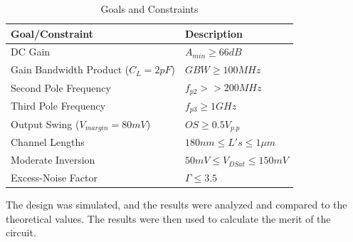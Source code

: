 \begin{table}[h]
    \centering
    \caption{Goals and Constraints}
    \begin{tabularx}{\textwidth}{>{\centering\arraybackslash}X >{\centering\arraybackslash}X}
        \toprule
        \textbf{Goal/Constraint} & \textbf{Description}\\
        \midrule
        DC Gain & $A_{min}\geq 66dB$\\
        \midrule
        Gain Bandwidth Product ($C_L = 2pF$) & $GBW\geq100MHz$ \\
        \midrule
        Second Pole Frequency & $f_{p2}>>200MHz$ \\
        \midrule
        Third Pole Frequency & $f_{p3} \geq 1GHz$ \\
        \midrule
        Output Swing ($V_{margin}=80mV$) & $OS\geq 0.5 V_{p.p}$ \\
        \midrule
        Channel Lengths & $180nm \leq L's \leq 1 \mu m$ \\
        \midrule
        Moderate Inversion & $50mV \leq V_{DSat} \leq 150mV$ \\
        \midrule
        Excess-Noise Factor & $\Gamma \leq 3.5 $\\
        \bottomrule
    \end{tabularx}
    \label{tab:goals}
\end{table}

The design was simulated, and the results were analyzed and compared to the theoretical values. The results were then used to calculate the merit of the circuit.

\pagebreak

